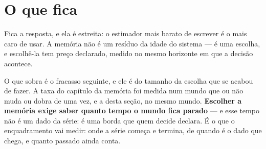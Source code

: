 \section{O que fica}

Fica a resposta, e ela é estreita: o estimador mais barato de escrever é o mais caro de usar. A
memória não é um resíduo da idade do sistema --- é uma escolha, e escolhê-la tem preço declarado,
medido no mesmo horizonte em que a decisão acontece.

O que sobra é o fracasso seguinte, e ele é do tamanho da escolha que se acabou de fazer. A taxa do
capítulo da memória foi medida num mundo que ou não muda ou dobra de uma vez, e a desta seção, no
mesmo mundo. \textbf{Escolher a memória exige saber quanto tempo o mundo fica parado} --- e esse
tempo não é um dado da série: é uma borda que quem decide declara. É o que o enquadramento vai
medir: onde a série começa e termina, de quando é o dado que chega, e quanto passado ainda conta.

